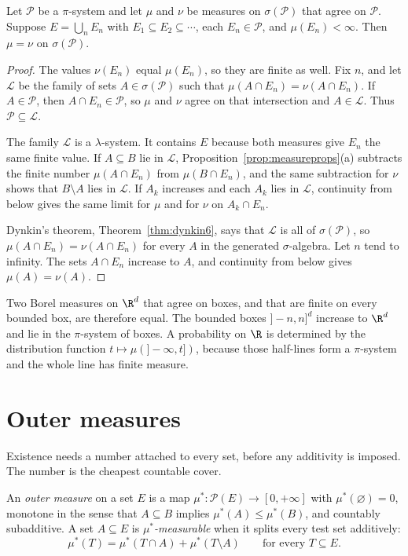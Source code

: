 \begin{theorem}\label{thm:uniq6}
Let $\mathcal P$ be a $\pi$-system and let $\mu$ and $\nu$ be measures on $\sigma(\mathcal P)$ that agree on $\mathcal P$.
Suppose $E=\bigcup_n E_n$ with $E_1\subseteq E_2\subseteq\cdots$, each $E_n\in\mathcal P$, and $\mu(E_n)<\infty$.
Then $\mu=\nu$ on $\sigma(\mathcal P)$.
\end{theorem}
\begin{proof}
The values $\nu(E_n)$ equal $\mu(E_n)$, so they are finite as well.
Fix $n$, and let $\mathcal L$ be the family of sets $A\in\sigma(\mathcal P)$ such that $\mu(A\cap E_n)=\nu(A\cap E_n)$.
If $A\in\mathcal P$, then $A\cap E_n\in\mathcal P$, so $\mu$ and $\nu$ agree on that intersection and $A\in\mathcal L$.
Thus $\mathcal P\subseteq\mathcal L$.

The family $\mathcal L$ is a $\lambda$-system.
It contains $E$ because both measures give $E_n$ the same finite value.
If $A\subseteq B$ lie in $\mathcal L$, Proposition~\ref{prop:measureprops}(a) subtracts the finite number $\mu(A\cap E_n)$ from $\mu(B\cap E_n)$, and the same subtraction for $\nu$ shows that $B\setminus A$ lies in $\mathcal L$.
If $A_k$ increases and each $A_k$ lies in $\mathcal L$, continuity from below gives the same limit for $\mu$ and for $\nu$ on $A_k\cap E_n$.

Dynkin's theorem, Theorem~\ref{thm:dynkin6}, says that $\mathcal L$ is all of $\sigma(\mathcal P)$, so $\mu(A\cap E_n)=\nu(A\cap E_n)$ for every $A$ in the generated $\sigma$-algebra.
Let $n$ tend to infinity.
The sets $A\cap E_n$ increase to $A$, and continuity from below gives $\mu(A)=\nu(A)$.
\end{proof}

Two Borel measures on $\R^d$ that agree on boxes, and that are finite on every bounded box, are therefore equal.
The bounded boxes $]-n,n]^d$ increase to $\R^d$ and lie in the $\pi$-system of boxes.
A probability on $\R$ is determined by the distribution function $t\mapsto\mu(]-\infty,t])$, because those half-lines form a $\pi$-system and the whole line has finite measure.

\section{Outer measures}

Existence needs a number attached to every set, before any additivity is imposed.
The number is the cheapest countable cover.

\begin{definition}
An \emph{outer measure} on a set $E$ is a map $\mu^*:\mathcal P(E)\to[0,+\infty]$ with $\mu^*(\varnothing)=0$, monotone in the sense that $A\subseteq B$ implies $\mu^*(A)\le\mu^*(B)$, and countably subadditive.
A set $A\subseteq E$ is \emph{$\mu^*$-measurable} when it splits every test set additively:
\[\mu^*(T)=\mu^*(T\cap A)+\mu^*(T\setminus A)\qquad\text{for every }T\subseteq E.\]
\end{definition}


